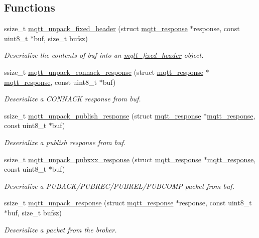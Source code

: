 \subsection*{Functions}
\begin{DoxyCompactItemize}
\item 
ssize\+\_\+t \hyperlink{group__unpackers_gad596aa5faf7f79e05fb15da33321db10}{mqtt\+\_\+unpack\+\_\+fixed\+\_\+header} (struct \hyperlink{structmqtt__response}{mqtt\+\_\+response} $\ast$response, const uint8\+\_\+t $\ast$buf, size\+\_\+t bufsz)
\begin{DoxyCompactList}\small\item\em Deserialize the contents of {\ttfamily buf} into an \hyperlink{structmqtt__fixed__header}{mqtt\+\_\+fixed\+\_\+header} object. \end{DoxyCompactList}\item 
ssize\+\_\+t \hyperlink{group__unpackers_gaa174fec8a214d65ee887b5b6c9b79d78}{mqtt\+\_\+unpack\+\_\+connack\+\_\+response} (struct \hyperlink{structmqtt__response}{mqtt\+\_\+response} $\ast$\hyperlink{structmqtt__response}{mqtt\+\_\+response}, const uint8\+\_\+t $\ast$buf)
\begin{DoxyCompactList}\small\item\em Deserialize a C\+O\+N\+N\+A\+CK response from {\ttfamily buf}. \end{DoxyCompactList}\item 
ssize\+\_\+t \hyperlink{group__unpackers_gae8ee6c1da210c4782f4f9939fe6ec828}{mqtt\+\_\+unpack\+\_\+publish\+\_\+response} (struct \hyperlink{structmqtt__response}{mqtt\+\_\+response} $\ast$\hyperlink{structmqtt__response}{mqtt\+\_\+response}, const uint8\+\_\+t $\ast$buf)
\begin{DoxyCompactList}\small\item\em Deserialize a publish response from {\ttfamily buf}. \end{DoxyCompactList}\item 
ssize\+\_\+t \hyperlink{group__unpackers_ga8c9b9bb3aab29bfca1408b9e5c5d4a01}{mqtt\+\_\+unpack\+\_\+pubxxx\+\_\+response} (struct \hyperlink{structmqtt__response}{mqtt\+\_\+response} $\ast$\hyperlink{structmqtt__response}{mqtt\+\_\+response}, const uint8\+\_\+t $\ast$buf)
\begin{DoxyCompactList}\small\item\em Deserialize a P\+U\+B\+A\+C\+K/\+P\+U\+B\+R\+E\+C/\+P\+U\+B\+R\+E\+L/\+P\+U\+B\+C\+O\+MP packet from {\ttfamily buf}. \end{DoxyCompactList}\item 
ssize\+\_\+t \hyperlink{group__unpackers_gaae124a93579dcd31e6f52411f4582fbd}{mqtt\+\_\+unpack\+\_\+response} (struct \hyperlink{structmqtt__response}{mqtt\+\_\+response} $\ast$response, const uint8\+\_\+t $\ast$buf, size\+\_\+t bufsz)
\begin{DoxyCompactList}\small\item\em Deserialize a packet from the broker. \end{DoxyCompactList}\end{DoxyCompactItemize}


